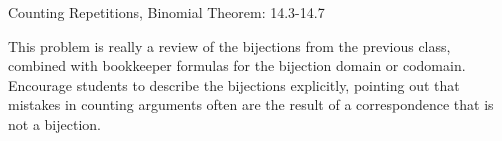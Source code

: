 \documentclass[handout]{mcs}
\begin{document}

\begin{staffnotes}
Counting Repetitions, Binomial Theorem: 14.3-14.7
\end{staffnotes}



\begin{staffnotes}
This problem is really a review of the bijections from the previous
class, combined with bookkeeper formulas for the bijection domain or
codomain.  Encourage students to describe the bijections explicitly,
pointing out that mistakes in counting arguments often are the result
of a correspondence that is not a bijection.
\end{staffnotes}

\end{document}
